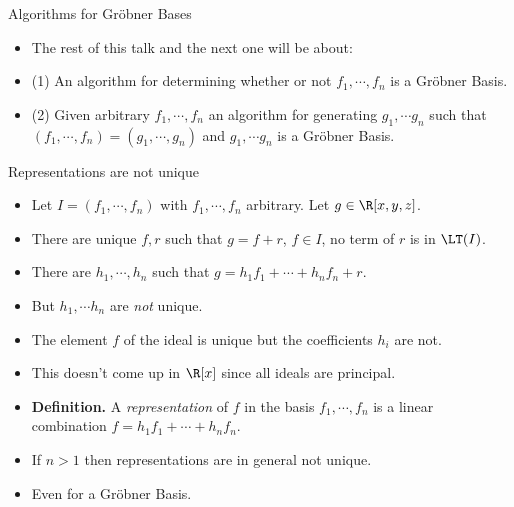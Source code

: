 \documentclass{beamer}
\begin{document}
\begin{frame}{Algorithms for Gr\"{o}bner Bases}

\begin{itemize}
  \item The rest of this talk and the next one will be about:
  \item (1) An algorithm for determining whether or not $f_1,\cdots,f_n$ is a Gr\"{o}bner Basis.
  \item (2) Given arbitrary $f_1,\cdots,f_n$ an algorithm for generating  $g_1,\cdots g_n$
  such that $(f_1,\cdots,f_n) = (g_1,\cdots,g_n)$ and
  $g_1,\cdots g_n$ is a Gr\"{o}bner Basis.
\end{itemize}
\end{frame}
\begin{frame}{Representations are not unique}

\begin{itemize}
  \item Let $I=(f_1,\cdots,f_n)$ with $f_1,\cdots,f_n$ arbitrary. Let $g\in\R[x,y,z]$.
  \item There are unique $f,r$ such that $g=f+r$, $f\in I$, no term of $r$ is in $\LT(I)$.
  \item There are $h_1,\cdots,h_n$ such that $g=h_1f_1 + \cdots + h_nf_n + r$.
  \item But $h_1,\cdots h_n$ are \emph{not} unique.
  \item The element $f$ of the ideal is unique but the coefficients $h_i$ are not.
  \item This doesn't come up in $\R[x]$ since all ideals are principal.
  \item \textbf{Definition.} A \emph{representation} of $f$ in the basis $f_1,\cdots,f_n$
  is a linear combination $f=h_1 f_1 + \cdots + h_n f_n$.
  \item If $n>1$ then representations are in general not unique.
  \item Even for a Gr\"{o}bner Basis.
\end{itemize}
\end{frame}
\end{document}
